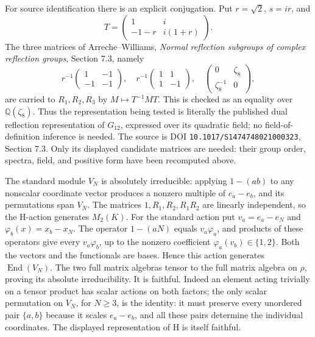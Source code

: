 For source identification there is an explicit conjugation. Put
\(r=\sqrt2\), \(s=ir\), and
\[
 T=\begin{pmatrix}1&i\\-1-r&i(1+r)\end{pmatrix}.
\]
The three matrices of Arreche--Williams, \emph{Normal reflection
subgroups of complex reflection groups}, Section 7.3, namely
\[
 r^{-1}\begin{pmatrix}1&-1\\-1&-1\end{pmatrix},\quad
 r^{-1}\begin{pmatrix}1&1\\1&-1\end{pmatrix},\quad
 \begin{pmatrix}0&\zeta_8\\\zeta_8^{-1}&0\end{pmatrix},
\]
are carried to \(R_1,R_2,R_3\) by \(M\mapsto T^{-1}MT\).
This is checked as an equality over \(\mathbb Q(\zeta_8)\).
Thus the representation being tested is literally the published dual
reflection representation of \(G_{12}\), expressed over its
quadratic field; no field-of-definition inference is needed.
The source is DOI \texttt{10.1017/S1474748021000323}, Section 7.3.
Only its displayed candidate matrices are needed: their group order,
spectra, field, and positive form have been recomputed above.

The standard module \(V_N\) is absolutely irreducible: applying
\(1-(ab)\) to any nonscalar coordinate vector produces a nonzero
multiple of \(e_a-e_b\), and its permutations span \(V_N\).
The matrices \(1,R_1,R_2,R_1R_2\) are linearly independent, so
the H-action generates \(M_2(K)\). For the standard action put
\(v_a=e_a-e_N\) and \(\varphi_b(x)=x_b-x_N\). The operator
\(1-(aN)\) equals \(v_a\varphi_a\), and products of these
operators give every \(v_a\varphi_b\), up to the nonzero
coefficient \(\varphi_a(v_b)\in\{1,2\}\). Both the vectors
and the functionals are bases. Hence this action generates
\(\operatorname{End}(V_N)\). The two full matrix algebras tensor
to the full matrix algebra on \(\rho\), proving its absolute
irreducibility. It is faithful. Indeed an element
acting trivially on a tensor product has scalar actions on both factors;
the only scalar permutation on \(V_N\), for \(N\ge3\), is the
identity: it must preserve every unordered pair \(\{a,b\}\)
because it scales \(e_a-e_b\), and all these pairs determine the
individual coordinates. The displayed representation of H is itself faithful.


